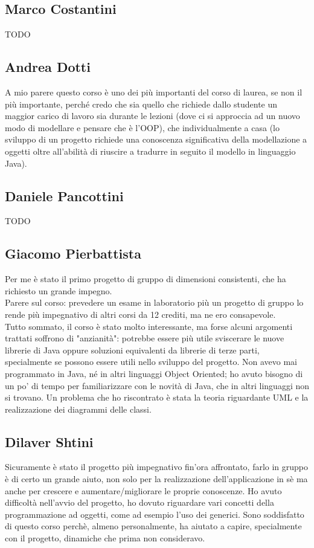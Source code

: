\documentclass[a4paper,12pt]{report}
\begin{document}
\subsection*{Marco Costantini}
{TODO}

\subsection*{Andrea Dotti}
A mio parere questo corso è uno dei più importanti del corso di laurea, se non il più importante, perché credo che sia quello che richiede dallo studente un maggior carico di lavoro sia durante le lezioni (dove ci si approccia ad un nuovo modo di modellare e pensare che è l'OOP), che individualmente a casa (lo sviluppo di un progetto richiede una conoscenza significativa della modellazione a oggetti oltre all'abilità di riuscire a tradurre in seguito il modello in linguaggio Java).

\subsection*{Daniele Pancottini}
{TODO}

\subsection*{Giacomo Pierbattista}
Per me è stato il primo progetto di gruppo di dimensioni consistenti, che ha richiesto un grande impegno.
\\Parere sul corso: prevedere un esame in laboratorio più un progetto di gruppo lo rende più
impegnativo di altri corsi da 12 crediti, ma ne ero consapevole.
\\Tutto sommato, il corso è stato molto interessante, ma forse alcuni argomenti trattati soffrono di "anzianità":
potrebbe essere più utile sviscerare le nuove librerie di Java oppure soluzioni equivalenti da librerie di terze parti,
specialmente se possono essere utili nello sviluppo del progetto.
Non avevo mai programmato in Java, né in altri linguaggi Object Oriented; ho avuto bisogno
di un po' di tempo per familiarizzare con le novità di Java, che in altri linguaggi non si trovano.
Un problema che ho riscontrato è stata la teoria riguardante UML e la realizzazione dei diagrammi delle classi.


\subsection*{Dilaver Shtini}
Sicuramente è stato il progetto più impegnativo fin'ora affrontato, farlo in gruppo è di certo un grande aiuto,
non solo per la realizzazione dell'applicazione in sè ma anche per crescere e aumentare/migliorare le proprie conoscenze.
Ho avuto difficoltà nell'avvio del progetto, ho dovuto riguardare vari concetti della programmazione ad oggetti,
come  ad esempio l'uso dei generici. Sono soddisfatto di questo corso perchè, almeno personalmente, ha aiutato a capire,
specialmente con il progetto, dinamiche che prima non consideravo.
\end{document}
